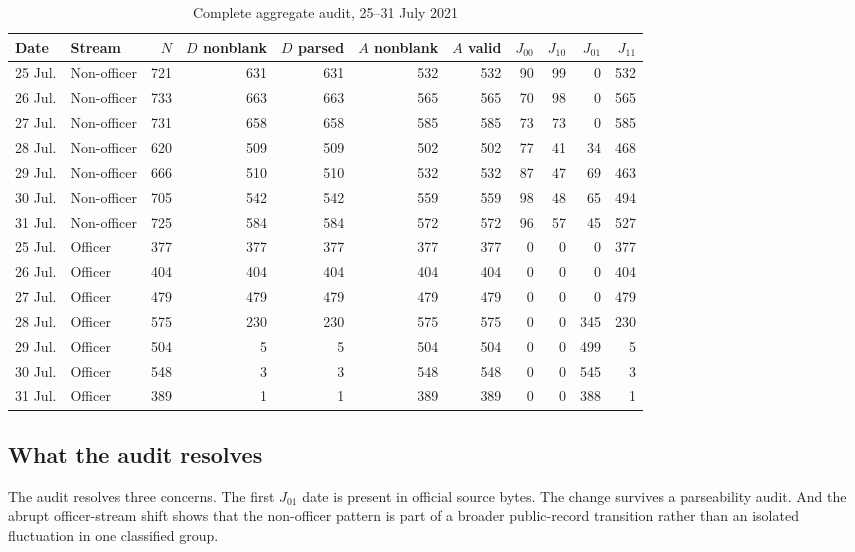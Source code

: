 \documentclass[11pt]{article}
\begin{document}
\begin{table}[!htbp]
\centering
\caption{Complete aggregate audit, 25--31 July 2021}
\label{tab:julyfull}
\begin{adjustbox}{width=\textwidth}
\begin{tabular}{@{}llrrrrrrrrr@{}}
\toprule
Date & Stream & $N$ & $D$ nonblank & $D$ parsed & $A$ nonblank & $A$ valid & $J_{00}$ & $J_{10}$ & $J_{01}$ & $J_{11}$ \\
\midrule
25 Jul. & Non-officer & 721 & 631 & 631 & 532 & 532 & 90 & 99 & 0 & 532 \\
26 Jul. & Non-officer & 733 & 663 & 663 & 565 & 565 & 70 & 98 & 0 & 565 \\
27 Jul. & Non-officer & 731 & 658 & 658 & 585 & 585 & 73 & 73 & 0 & 585 \\
28 Jul. & Non-officer & 620 & 509 & 509 & 502 & 502 & 77 & 41 & 34 & 468 \\
29 Jul. & Non-officer & 666 & 510 & 510 & 532 & 532 & 87 & 47 & 69 & 463 \\
30 Jul. & Non-officer & 705 & 542 & 542 & 559 & 559 & 98 & 48 & 65 & 494 \\
31 Jul. & Non-officer & 725 & 584 & 584 & 572 & 572 & 96 & 57 & 45 & 527 \\
\midrule
25 Jul. & Officer & 377 & 377 & 377 & 377 & 377 & 0 & 0 & 0 & 377 \\
26 Jul. & Officer & 404 & 404 & 404 & 404 & 404 & 0 & 0 & 0 & 404 \\
27 Jul. & Officer & 479 & 479 & 479 & 479 & 479 & 0 & 0 & 0 & 479 \\
28 Jul. & Officer & 575 & 230 & 230 & 575 & 575 & 0 & 0 & 345 & 230 \\
29 Jul. & Officer & 504 & 5 & 5 & 504 & 504 & 0 & 0 & 499 & 5 \\
30 Jul. & Officer & 548 & 3 & 3 & 548 & 548 & 0 & 0 & 545 & 3 \\
31 Jul. & Officer & 389 & 1 & 1 & 389 & 389 & 0 & 0 & 388 & 1 \\
\bottomrule
\end{tabular}
\end{adjustbox}
\end{table}

\subsection{What the audit resolves}

The audit resolves three concerns. The first $J_{01}$ date is present in official source bytes. The change survives a parseability audit. And the abrupt officer-stream shift shows that the non-officer pattern is part of a broader public-record transition rather than an isolated fluctuation in one classified group.
\end{document}
